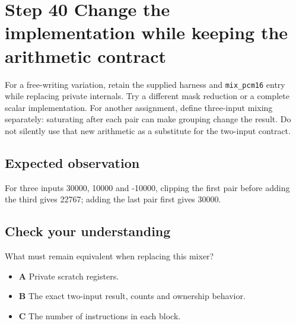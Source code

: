 \section{Step 40 Change the implementation while keeping the arithmetic contract}\label{pcm-s40}

For a free-writing variation, retain the supplied harness and \texttt{mix\_pcm16} entry while replacing private internals. Try a different mask reduction or a complete scalar implementation. For another assignment, define three-input mixing separately: saturating after each pair can make grouping change the result. Do not silently use that new arithmetic as a substitute for the two-input contract.

\subsection{Expected observation}
For three inputs 30000, 10000 and -10000, clipping the first pair before adding the third gives 22767; adding the last pair first gives 30000.

\subsection{Check your understanding}
What must remain equivalent when replacing this mixer?

\begin{itemize}
  \item \textbf{A} Private scratch registers.
  \item \textbf{B} The exact two-input result, counts and ownership behavior.
  \item \textbf{C} The number of instructions in each block.
\end{itemize}
